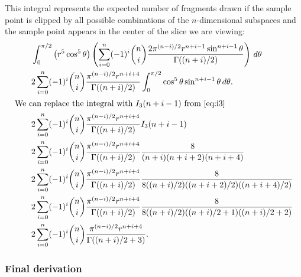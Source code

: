 \begin{lem}

This integral represents the expected number of fragments drawn if the sample
point is clipped by all possible combinations of the $n$-dimensional 
subspaces and the sample point appears in the center of the slice we are 
viewing:
\begin{align*}
  \qquad & \int_{0}^{\pi/2}
           \left(r^5 \cos^5 \theta\right)
           \left(
             \sum_{i=0}^{n} (-1)^i {n \choose i}
                            \frac{2\pi^{(n-i)/2} r^{n+i-1} \sin^{n+i-1} \theta}
                                 {\Gamma((n+i)/2)} 
           \right) \, d\theta \\
  \qquad & 2 \sum_{i=0}^{n} (-1)^i {n \choose i}
                            \frac{\pi^{(n-i)/2} r^{n+i+4}}
                                 {\Gamma((n+i)/2)} 
           \int_{0}^{\pi/2} \cos^5 \theta \sin^{n+i-1} \theta \, d\theta \text{.}\\
\intertext{We can replace the integral with $I_3(n+i-1)$ from \autoref{eq:i3}}
  \qquad & 2 \sum_{i=0}^{n} (-1)^i {n \choose i}
                            \frac{\pi^{(n-i)/2} r^{n+i+4}}
                                 {\Gamma((n+i)/2)} 
           I_3(n+i-1) \\
   \qquad & 2 \sum_{i=0}^{n} (-1)^i {n \choose i}
                            \frac{\pi^{(n-i)/2} r^{n+i+4}}
                                 {\Gamma((n+i)/2)} 
           \frac{8}{(n+i)(n+i+2)(n+i+4)} \\
   \qquad & 2 \sum_{i=0}^{n} (-1)^i {n \choose i}
                            \frac{\pi^{(n-i)/2} r^{n+i+4}}
                                 {\Gamma((n+i)/2)} 
           \frac{8}{8((n+i)/2)((n+i+2)/2)((n+i+4)/2)} \\
   \qquad & 2 \sum_{i=0}^{n} (-1)^i {n \choose i}
                            \frac{\pi^{(n-i)/2} r^{n+i+4}}
                                 {\Gamma((n+i)/2)} 
           \frac{8}{8((n+i)/2)((n+i)/2+1)((n+i)/2+2)} \\
   \qquad & 2 \sum_{i=0}^{n}(-1)^i {n \choose i}
                            \frac{\pi^{(n-i)/2} r^{n+i+4}}
                                 {\Gamma((n+i)/2+3)}
\text{.}
\end{align*}
\end{lem}

\subsubsection{Final derivation}

